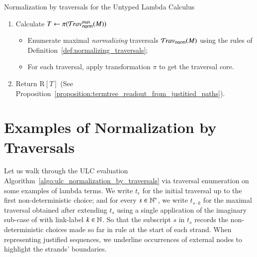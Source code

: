 \documentclass{elsarticle}
\theoremstyle{plain}
\theoremstyle{definition}
\newcommand{\normalizing}{{\sf norm}}
\newcommand{\travsetnorm}{\travset_\normalizing} %
\def\readout{\mathrm{R}} %
\def\coresymbol{\pi} %
\newcommand{\core}[1]{\coresymbol(#1)} %
\begin{document}
\begin{algorithm}%
\begin{algorithmic}
\caption{Normalization by traversals for the Untyped Lambda Calculus}
\label{algo:ulc_normalization_by_traversals}
\begin{enumerate}[nosep]
  \item Calculate $T \leftarrow \core{\travsetnorm^{\max}(M)}$
  \begin{itemize}[leftmargin=0.5em,nosep]
    \item Enumerate maximal \emph{normalizing} traversals $\travsetnorm(M)$ using the rules of Definition~\ref{def:normalizing_traversals};
    \item For each traversal, apply transformation $\coresymbol$ to get the traversal core.
  \end{itemize}
  \item Return $\readout[T]$ (See Proposition~\ref{proposition:termtree_readout_from_justitied_paths}).
\end{enumerate}
\end{algorithmic}
\end{algorithm}

\section{Examples of Normalization by Traversals}
\label{sec:examples}
Let us walk through the ULC evaluation Algorithm~\ref{algo:ulc_normalization_by_traversals} via traversal enumeration on some examples of lambda terms. We write $t_\epsilon$  for the initial traversal up to the first non-deterministic choice; and for every $s \in \mathbb{N}^*$, we write $t_{s \cdot k}$ for the maximal traversal obtained after extending $t_s$ using a single application of the imaginary sub-case of  with link-label $k \in \mathbb{N}$. So that the subscript $s$ in $t_s$ records the non-deterministic choices made so far in rule 
at the start of each strand.
When representing justified sequences, we underline occurrences of external nodes to highlight the strands' boundaries.
\end{document}
